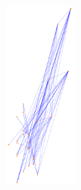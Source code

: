 \documentclass{article}
\newcommand{\wFour}{0.24\textwidth}
\begin{document}
\begin{figure}
{    \includegraphics[width=\wFour]{plot/map.ax.sym-n.ucidata-zachary}}
\end{figure}
\end{document}
